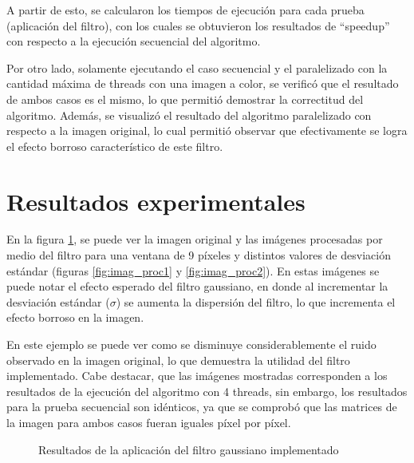 \documentclass {article}
\begin{document}
A partir de esto, se calcularon los tiempos de ejecución para cada prueba (aplicación del filtro),
con los cuales se obtuvieron los resultados de ``speedup'' con respecto a la ejecución secuencial
del algoritmo.

Por otro lado, solamente ejecutando el caso secuencial y el paralelizado con la cantidad máxima de
threads con una imagen a color, se verificó que el resultado de ambos casos es el mismo, lo que
permitió demostrar la correctitud del algoritmo. Además, se visualizó el resultado del algoritmo
paralelizado con respecto a la imagen original, lo cual permitió observar que efectivamente se
logra el efecto borroso característico de este filtro.

\section{Resultados experimentales}

En la figura \ref{fig:result_filtro}, se puede ver la imagen original y las imágenes procesadas por
medio del filtro para una ventana de 9 píxeles y distintos valores de desviación estándar (figuras
\ref{fig:imag_proc1} y \ref{fig:imag_proc2}). En estas imágenes se puede notar el efecto esperado
del filtro gaussiano, en donde al incrementar la desviación estándar ($\sigma$) se aumenta la
dispersión del filtro, lo que incrementa el efecto borroso en la imagen.

En este ejemplo se puede ver como se disminuye considerablemente el ruido observado en la imagen
original, lo que demuestra la utilidad del filtro implementado. Cabe destacar, que las imágenes
mostradas corresponden a los resultados de la ejecución del algoritmo con 4 threads, sin embargo,
los resultados para la prueba secuencial son idénticos, ya que se comprobó que las matrices de la
imagen para ambos casos fueran iguales píxel por píxel.

\begin{figure}[H]
  \centering
  \caption{\label{fig:result_filtro}Resultados de la aplicación del filtro gaussiano implementado \protect}
\end{figure}
\end{document}
